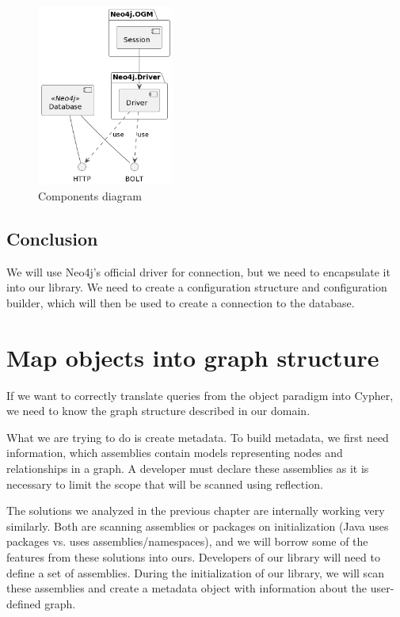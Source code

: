 \begin{figure}[H]
    \centering
    \includegraphics[width=0.4\textwidth]{content/components.png}
    \caption{Components diagram}
\end{figure}

\subsection{Conclusion}

We will use Neo4j's official driver for connection, but we need to encapsulate it into our library.
We need to create a configuration structure and configuration builder, which will then be used to create a connection to the database.

\section {Map objects into graph structure}

If we want to correctly translate queries from the object paradigm into Cypher, we need to know the graph structure described in our domain.

What we are trying to do is create metadata. To build metadata, we first need information, which assemblies contain models representing nodes and relationships in a graph. A developer must declare these assemblies as it is necessary to limit the scope that will be scanned using reflection.

The solutions we analyzed in the previous chapter are internally working very similarly. Both are scanning assemblies or packages on initialization (Java uses packages vs. \CS uses assemblies/namespaces), and we will borrow some of the features from these solutions into ours.
Developers of our library will need to define a set of assemblies. During the initialization of our library, we will scan these assemblies and create a metadata object with information about the user-defined graph.

